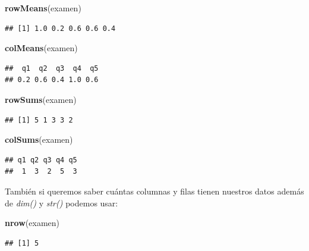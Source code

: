 \documentclass[
]{book}
\newenvironment{Shaded}{\begin{snugshade}}{\end{snugshade}}
\newcommand{\FunctionTok}[1]{\textcolor[rgb]{0.13,0.29,0.53}{\textbf{#1}}}
\newcommand{\NormalTok}[1]{#1}
\begin{document}
\begin{Shaded}
\begin{Highlighting}[]
\FunctionTok{rowMeans}\NormalTok{(examen)}
\end{Highlighting}
\end{Shaded}

\begin{verbatim}
## [1] 1.0 0.2 0.6 0.6 0.4
\end{verbatim}

\begin{Shaded}
\begin{Highlighting}[]
\FunctionTok{colMeans}\NormalTok{(examen)}
\end{Highlighting}
\end{Shaded}

\begin{verbatim}
##  q1  q2  q3  q4  q5 
## 0.2 0.6 0.4 1.0 0.6
\end{verbatim}

\begin{Shaded}
\begin{Highlighting}[]
\FunctionTok{rowSums}\NormalTok{(examen)}
\end{Highlighting}
\end{Shaded}

\begin{verbatim}
## [1] 5 1 3 3 2
\end{verbatim}

\begin{Shaded}
\begin{Highlighting}[]
\FunctionTok{colSums}\NormalTok{(examen)}
\end{Highlighting}
\end{Shaded}

\begin{verbatim}
## q1 q2 q3 q4 q5 
##  1  3  2  5  3
\end{verbatim}

\hfill\break

También si queremos saber cuántas columnas y filas tienen nuestros datos además de \emph{dim()} y \emph{str()} podemos usar:

\begin{Shaded}
\begin{Highlighting}[]
\FunctionTok{nrow}\NormalTok{(examen)}
\end{Highlighting}
\end{Shaded}

\begin{verbatim}
## [1] 5
\end{verbatim}
\end{document}
